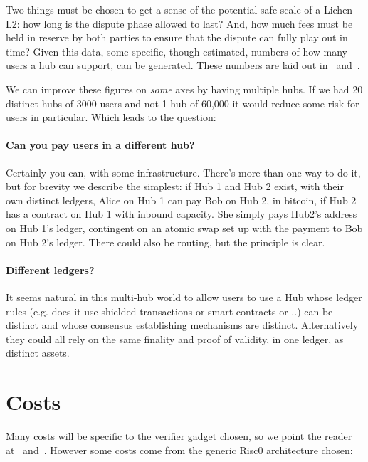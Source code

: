 \documentclass[11pt]{article}
\begin{document}
Two things must be chosen to get a sense of the potential safe scale of a Lichen L2: how long is the dispute phase allowed to last? And, how much fees must be held in reserve by both parties to ensure that the dispute can fully play out in time? Given this data, some specific, though estimated, numbers of how many users a hub can support, can be generated. These numbers are laid out in~\cite{lichenbitvmx} and~\cite{lichenbabe}.

We can improve these figures on \emph{some} axes by having multiple hubs. If we had 20 distinct hubs of 3000 users and not 1 hub of 60,000 it would reduce some risk for users in particular. Which leads to the question:

\paragraph{ Can you pay users in a different hub?} Certainly you can, with some infrastructure. There's more than one way to do it, but for brevity we describe the simplest: if Hub 1 and Hub 2 exist, with their own distinct ledgers, Alice on Hub 1 can pay Bob on Hub 2, in bitcoin, if Hub 2 has a contract on Hub 1 with inbound capacity. She simply pays Hub2's address on Hub 1's ledger, contingent on an atomic swap set up with the payment to Bob on Hub 2's ledger. There could also be routing, but the principle is clear.

\paragraph{Different ledgers?} It seems natural in this multi-hub world to allow users to use a Hub whose ledger rules (e.g. does it use shielded transactions or smart contracts or ..) can be distinct and whose consensus establishing mechanisms are distinct. Alternatively they could all rely on the same finality and proof of validity, in one ledger, as distinct assets.

\section{Costs}
\label{sec:costs}

Many costs will be specific to the verifier gadget chosen, so we point the reader at~\cite{lichenbitvmx} and~\cite{lichenbabe}. However some costs come from the generic Risc0 architecture chosen:
\end{document}

